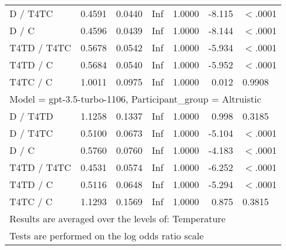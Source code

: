 \begin{table}[ht]
\begin{tabular}{lrrrrrl}
  D / T4TC & 0.4591 & 0.0440 & Inf & 1.0000 & -8.115 & $<$.0001 \\ 
  D / C & 0.4596 & 0.0439 & Inf & 1.0000 & -8.144 & $<$.0001 \\ 
  T4TD / T4TC & 0.5678 & 0.0542 & Inf & 1.0000 & -5.934 & $<$.0001 \\ 
  T4TD / C & 0.5684 & 0.0540 & Inf & 1.0000 & -5.952 & $<$.0001 \\ 
  T4TC / C & 1.0011 & 0.0975 & Inf & 1.0000 & 0.012 & 0.9908 \\ 
   \hline
\multicolumn{7}{l}{Model = gpt-3.5-turbo-1106, Participant_group = Altruistic}\\
D / T4TD & 1.1258 & 0.1337 & Inf & 1.0000 & 0.998 & 0.3185 \\ 
  D / T4TC & 0.5100 & 0.0673 & Inf & 1.0000 & -5.104 & $<$.0001 \\ 
  D / C & 0.5760 & 0.0760 & Inf & 1.0000 & -4.183 & $<$.0001 \\ 
  T4TD / T4TC & 0.4531 & 0.0574 & Inf & 1.0000 & -6.252 & $<$.0001 \\ 
  T4TD / C & 0.5116 & 0.0648 & Inf & 1.0000 & -5.294 & $<$.0001 \\ 
  T4TC / C & 1.1293 & 0.1569 & Inf & 1.0000 & 0.875 & 0.3815 \\ 
   \hline
\multicolumn{7}{l}{{\footnotesize Results are averaged over the levels of: Temperature}}\\

\multicolumn{7}{l}{{\footnotesize Tests are performed on the log odds ratio scale}}\\
\end{tabular}
\end{table}
